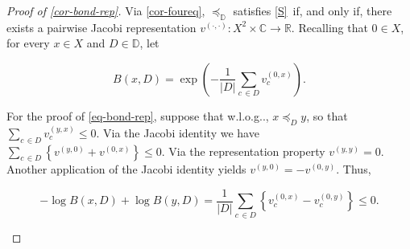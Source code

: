 \documentclass[ecta,nameyear,draft]{econsocart}
\makeatletter
\newcommand{\R}{\mathbb R}
\newcommand{\mbbd}{{\mathds D}}
\newcommand{\mbbc}{{\mathds C}}
\newcommand{\xy}{{(x, y)}}
\newcommand{\yx}{{(y, x)}}
\newcommand{\dd}{{(\cdot,\cdot)}}
\newcommand{\stability}{\ref{S}}
\newcommand\withoutlog{w\@.l\@.o\@.g\@ifnextchar.{}{.\@}}
\theoremstyle{plain}
\theoremstyle{remark}
\makeatother
\begin{document}
\begin{proof}[Proof of \cref{cor-bond-rep}] Via \cref{cor-foureq},
  $\preceq_{\mbbd}$ satisfies \stability\ if, and only if, there exists a
  pairwise Jacobi representation $v^{\dd}: X^{2} \times \mbbc \rightarrow \R$.
  Recalling that $0 \in X$, for every $x\in X$ and $D \in \mbbd$, let
  \begin{linenomath*}
    \begin{equation}\label{eq-bond-vxy} \textstyle B(x,D) = \exp\left(
        -\frac{1}{\lvert D \rvert} \sum_{c\,\in D}
      v^{(0, x)}_{c} \right).
    \end{equation}
  \end{linenomath*}
  For the proof of \eqref{eq-bond-rep}, suppose that \withoutlog, $x
  \preceq_{D} y$, so that $\sum_{c\,\in D} v^{\yx}_{c} \leq 0$. Via the Jacobi
  identity we have $ \sum_{c\,\in D} \left\{v^{(y,0)} + v^{(0,x)} \right\} \leq
  0$.  Via the representation property $v^{(y, y)} = 0$.  Another application
  of the Jacobi identity yields $v^{(y, 0)} = -v^{(0, y)}$. Thus, 
  \begin{linenomath*}
    \begin{equation*}
      \textstyle - \log B(x,D) + \log B(y,D) = \frac{1}{\lvert D\rvert}
      \sum_{c\,\in D} \left \{v^{(0, x)}_{c} - v^{(0, y)}_{c}\right \} \leq 0.
    \end{equation*}
  \end{linenomath*}


\end{proof}
\end{document}
